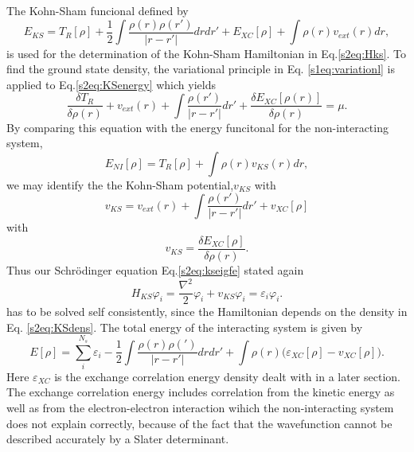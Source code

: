\documentclass[a4paper,10pt,english]{article}%
\begin{document}
The Kohn-Sham funcional defined by
\begin{equation}
	E_{KS}=T_R[\rho]+\frac{1}{2}\int\frac{\rho(r)\rho(r')}{|r-r'|}drdr'+E_{XC}[\rho]+\int\rho(r)v_{ext}(r)dr,
  \label{s2eq:KSenergy}
\end{equation}
is used for the determination of the Kohn-Sham Hamiltonian in Eq.\eqref{s2eq:Hks}.
To find the ground state density, the variational principle in Eq. \eqref{s1eq:variationl} is applied to Eq.\eqref{s2eq:KSenergy} which yields
\begin{equation}
  \frac{\delta T_R}{\delta \rho(r)}+v_{ext}(r)+\int\frac{\rho(r')}{|r-r'|}dr'+\frac{\delta E_{XC}[\rho(r)]}{\delta\rho(r)}=\mu.
  \label{s2eq:varappl}
\end{equation}
By comparing this equation with the energy funcitonal for the non-interacting
system, 
\begin{equation}
  E_{NI}[\rho]=T_R[\rho]+\int\rho(r)v_{KS}(r)dr,
  \label{s2eq:noninterfunc}
\end{equation}
we may identify the the Kohn-Sham potential,$v_{KS}$ with
\begin{equation}
  v_{KS}=v_{ext}(r)+\int\frac{\rho(r')}{|r-r'|}dr'+v_{XC}[\rho]
  \label{s2eq:vKS}
\end{equation}
with 
\begin{equation}
  v_{KS}=\frac{\delta E_{XC}[\rho]}{\delta \rho(r)}.
  \label{s2eq:vXC}
\end{equation}
Thus our Schr\"odinger equation Eq.\eqref{s2eq:kseigfe} stated again
\begin{equation*}
  H_{KS}\varphi_i=\frac{\nabla^2}{2}\varphi_i+v_{KS}\varphi_i=\varepsilon_i\varphi_i.
\end{equation*}
has to be solved self consistently, since the Hamiltonian depends on the density in Eq. \eqref{s2eq:KSdens}. The total energy of the interacting system is given by
\begin{equation}
  E[\rho]=\sum_i^{N_s}\varepsilon_i-\frac{1}{2}\int\frac{\rho(r)\rho(')}{|r-r'|}drdr'+\int\rho(r)\big(\varepsilon_{XC}[\rho]-v_{XC}[\rho]\big).
  \label{s2eq:totalenergy}
\end{equation}
Here $\varepsilon_{XC}$ is the exchange correlation energy density dealt with in a later section. The exchange correlation energy includes correlation from
the kinetic energy as well as from the electron-electron interaction wihich the
non-interacting system does not explain correctly, because of the fact that
the wavefunction cannot be described accurately by a Slater determinant.





\end{document}
